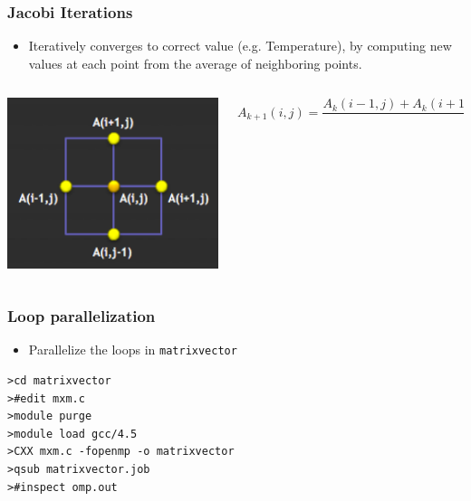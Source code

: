 \documentclass[xcolor=table,10pt,final]{beamer}
\begin{document}
\begin{frame}
  \frametitle{Jacobi Iterations\footnotemark[1]}
  \begin{itemize}
    \item Iteratively converges to correct value (e.g. Temperature), by computing new values at each point from the average of neighboring points.
  \end{itemize}
  \begin{columns}
    \begin{column}{0.25\textwidth}
      \includegraphics[width=\columnwidth]{figures/jacobi}
    \end{column}
    \begin{column}{0.75\textwidth}
      \scriptsize
      \begin{equation*}
	A_{k+1}(i,j) = \frac{A_k(i-1,j)+A_k(i+1,j)+A_k(i,j-1)+A_k(i,j+1)}{4}
      \end{equation*}
      \normalsize
    \end{column}
  \end{columns}
\end{frame}


\begin{frame}[fragile]
  \frametitle{Loop parallelization}
  \begin{itemize}
    \item Parallelize the loops in {\tt matrixvector}
  \end{itemize}
      \begin{verbatim}
>cd matrixvector
>#edit mxm.c
>module purge
>module load gcc/4.5
>CXX mxm.c -fopenmp -o matrixvector
>qsub matrixvector.job
>#inspect omp.out
     \end{verbatim}
\end{frame}
\end{document}
